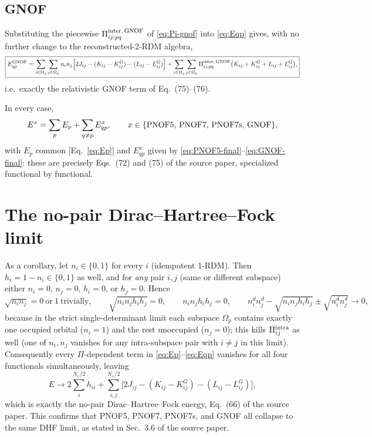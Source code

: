 \documentclass[11pt,a4paper]{article}
\newcommand{\PiMat}{\Pi}
\newcommand{\Om}{\Omega}
\newcommand{\hi}{h_i}
\newcommand{\hj}{h_j}
\begin{document}
\subsection{GNOF}
Substituting the piecewise $\PiMat^{\rm inter,\,GNOF}_{ij;pq}$ of
\eqref{eq:Pi-gnof} into \eqref{eq:Eqp} gives, with no further change
to the reconstructed-2-RDM algebra,
\begin{equation}
\boxed{
E_{qp}^{\rm GNOF}=\sum_{i\in\Om_q}\sum_{j\in\Om_p}n_in_j\Big[2J_{ij}-(K_{ij}-K^G_{ij})-(L_{ij}-L^G_{ij})\Big]
+\sum_{i\in\Om_q}\sum_{j\in\Om_p}\PiMat^{\rm inter,\,GNOF}_{ij;pq}\big(K_{ij}+K^G_{ij}+L_{ij}+L^G_{ij}\big),
}
\label{eq:GNOF-final}
\end{equation}
i.e.\ exactly the relativistic GNOF term of Eq.~(75)--(76).

In every case,
\begin{equation}
E^{x}=\sum_pE_p+\sum_{q\neq p}E_{qp}^{x},\qquad x\in\{{\rm PNOF5,\,PNOF7,\,PNOF7s,\,GNOF}\},
\end{equation}
with $E_p$ common [Eq.~\eqref{eq:Ep}] and $E_{qp}^{x}$ given by
\eqref{eq:PNOF5-final}--\eqref{eq:GNOF-final}: these are precisely
Eqs.~(72) and (75) of the source paper, specialized functional by
functional.

\section{The no-pair Dirac--Hartree--Fock limit}
\label{sec:HFlimit}

As a corollary, let $n_i\in\{0,1\}$ for every $i$ (idempotent
1-RDM). Then $h_i=1-n_i\in\{0,1\}$ as well, and for \emph{any} pair
$i,j$ (same or different subspace) either $n_i=0$, $n_j=0$, $h_i=0$,
or $h_j=0$. Hence
\begin{equation}
\sqrt{n_in_j}=0\ \text{or}\ 1\ \text{trivially},\qquad
\sqrt{n_in_j\hi\hj}=0,\qquad n_in_j\hi\hj=0,\qquad
n_i^dn_j^d-\sqrt{n_in_j\hi\hj}\pm\sqrt{n_i^dn_j^d}\to0,
\end{equation}
because in the strict single-determinant limit each subspace $\Om_p$
contains exactly one occupied orbital ($n_i=1$) and the rest
unoccupied ($n_j=0$); this kills $\PiMat^{\rm intra}_{ij}$ as well
(one of $n_i,n_j$ vanishes for any intra-subspace pair with $i\ne j$
in this limit). Consequently every $\PiMat$-dependent term in
\eqref{eq:Ep}--\eqref{eq:Eqp} vanishes for all four functionals
simultaneously, leaving
\begin{equation}
E\to2\sum_{i}^{N_e/2}h_{ii}+\sum_{i,j}^{N_e/2}\Big[2J_{ij}-(K_{ij}-K^G_{ij})-(L_{ij}-L^G_{ij})\Big],
\end{equation}
which is exactly the no-pair Dirac--Hartree--Fock energy, Eq.~(66) of
the source paper. This confirms that PNOF5, PNOF7, PNOF7s, and GNOF
all collapse to the same DHF limit, as stated in Sec.~3.6 of the
source paper.
\end{document}
